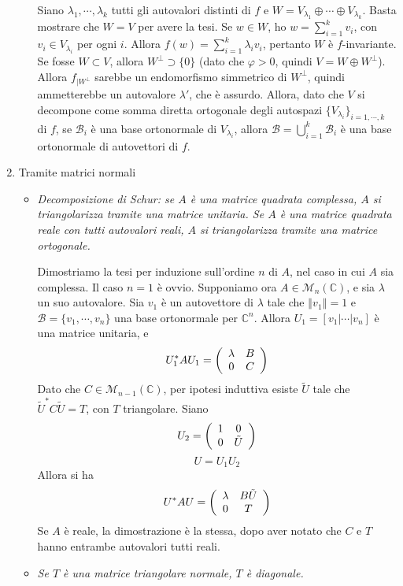 \documentclass[a4paper,11pt]{article}
\newcommand{\norm}[1]{\left\Vert#1\right\Vert}		%
\newcommand{\agg}[1]{#1^*}							%
\newcommand{\base}[1]{\mathcal{#1}}				%
\begin{document}
\begin{enumerate}
\begin{itemize}
		\noindent Siano $\lambda_1,\cdots,\lambda_k$ tutti gli autovalori distinti di $f$ e $W=V_{\lambda_1}\oplus\cdots\oplus V_{\lambda_k}$. Basta mostrare che $W=V$ per avere la tesi. Se $w\in W$, ho $w=\sum_{i=1}^{k}v_i$, con $v_i\in V_{\lambda_i}$ per ogni $i$. Allora $f(w)=\sum_{i=1}^{k}\lambda_i v_i$, pertanto $W$ è $f$-invariante. Se fosse $W\subset V$, allora $W^\perp\supset\{0\}$ (dato che $\varphi>0$, quindi $V=W\oplus W^\perp$). Allora $f_{|W^\perp}$ sarebbe un endomorfismo simmetrico di $W^\perp$, quindi ammetterebbe un autovalore $\lambda'$, che è assurdo. Allora, dato che $V$ si decompone come somma diretta ortogonale degli autospazi $\{V_{\lambda_i}\}_{i=1,\cdots,k}$ di $f$, se $\base{B}_i$ è una base ortonormale di $V_{\lambda_i}$, allora $\base{B}=\bigcup_{i=1}^k\base{B}_i$ è una base ortonormale di autovettori di $f$.
	\end{itemize}
	\item Tramite matrici normali
	\begin{itemize}
		\item \textit{Decomposizione di Schur: se $A$ è una matrice quadrata complessa, $A$ si triangolarizza tramite una matrice unitaria. Se $A$ è una matrice quadrata reale con tutti autovalori reali, $A$ si triangolarizza tramite una matrice ortogonale.} 
		
		\noindent Dimostriamo la tesi per induzione sull'ordine $n$ di $A$, nel caso in cui $A$ sia complessa. Il caso $n=1$ è ovvio. Supponiamo ora $A\in\mathcal{M}_n(\mathbb{C})$, e sia $\lambda$ un suo autovalore. Sia $v_1$ è un autovettore di $\lambda$ tale che $\norm{v_1}=1$ e $\base{B}=\{v_1,\cdots,v_n\}$ una base ortonormale per $\mathbb{C}^n$. Allora $U_1=[v_1|\cdots|v_n]$ è una matrice unitaria, e \[\agg{U_1}AU_1=\left(\begin{array}{c c}
		\lambda & B \\
		0 & C \\
		\end{array}\right)\]
		Dato che $C\in\mathcal{M}_{n-1}(\mathbb{C})$, per ipotesi induttiva esiste $\tilde{U}$ tale che $\agg{\tilde{U}}C\tilde U=T$, con $T$ triangolare. Siano
		\[U_2=\left(\begin{array}{c c}
		1&0\\
		0&\tilde{U}\\
		\end{array}\right)\]
		\[U=U_1U_2\]
		Allora si ha
		\[\agg{U}AU=\left(\begin{array}{c c}
		\lambda &B\tilde{U} \\
		0 & T\\
		\end{array}\right)\]
		Se $A$ è reale, la dimostrazione è la stessa, dopo aver notato che $C$ e $T$ hanno entrambe autovalori tutti reali.
		\item \textit{Se $T$ è una matrice triangolare normale, $T$ è diagonale.}
		

\end{itemize}
\end{enumerate}
\end{document}
